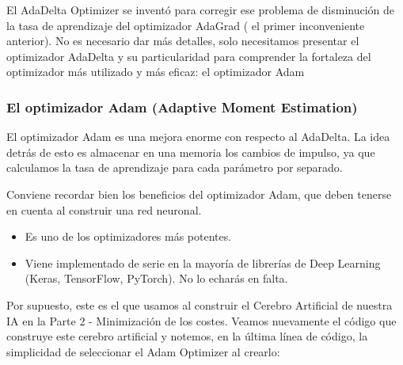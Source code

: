 \documentclass[
]{book}
\providecommand{\tightlist}{%
  \setlength{\itemsep}{0pt}\setlength{\parskip}{0pt}}
\begin{document}
El AdaDelta Optimizer se inventó para corregir ese problema de disminución de la tasa de aprendizaje del optimizador AdaGrad ( el primer inconveniente anterior). No es necesario dar más detalles, solo necesitamos presentar el optimizador AdaDelta y su particularidad para comprender la fortaleza del optimizador más utilizado y más eficaz: el optimizador Adam

\hypertarget{el-optimizador-adam-adaptive-moment-estimation}{%
\subsubsection{El optimizador Adam (Adaptive Moment Estimation)}\label{el-optimizador-adam-adaptive-moment-estimation}}

El optimizador Adam es una mejora enorme con respecto al AdaDelta. La idea detrás de esto es almacenar en una memoria los cambios de impulso, ya que calculamos la tasa de aprendizaje para cada parámetro por separado.

Conviene recordar bien los beneficios del optimizador Adam, que deben tenerse en cuenta al construir una red neuronal.

\begin{itemize}
\tightlist
\item
  Es uno de los optimizadores más potentes.
\item
  Viene implementado de serie en la mayoría de librerías de Deep Learning (Keras, TensorFlow, PyTorch). No lo echarás en falta.
\end{itemize}

Por supuesto, este es el que usamos al construir el Cerebro Artificial de nuestra IA en la Parte 2 - Minimización de los costes. Veamos nuevamente el código que construye este cerebro artificial y notemos, en la última línea de código, la simplicidad de seleccionar el Adam Optimizer al crearlo:
\end{document}
